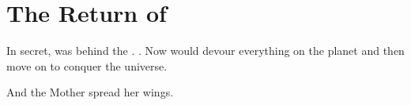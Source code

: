 \section[The Return of Tyrasshana]{The Return of \Tiamat}
%
In secret, \Tiamat was behind the \resphain. 
.
Now \Tiamat would devour everything on the planet and then move on to conquer the universe. 

And the Mother spread her wings. 























